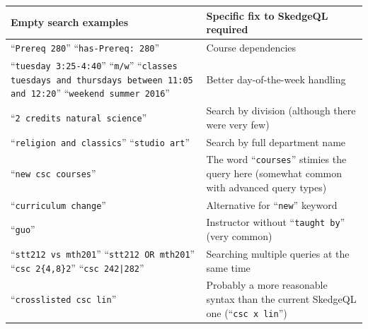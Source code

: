 \singlespacing
{\renewcommand{\arraystretch}{1.75}
\begin{center}
\begin{table}[H]
\vspace{5pt}
  \begin{tabular}{ p{6cm} p{7.5cm} }

    {\large Empty search examples}
    & {\large Specific fix to SkedgeQL required} \\

    \hline
  \hline

    ``{\tt Prereq 280}'' \newline ``{\tt has-Prereq: 280}''
    & Course dependencies \\ \hline

    ``{\tt tuesday 3:25-4:40}'' \newline ``{\tt m/w}'' \newline ``{\tt classes tuesdays and thursdays between 11:05 and 12:20}'' \newline ``{\tt weekend summer 2016}''
    & \parbox[c]{\hsize}{Better day-of-the-week handling} \\ \hline

    ``{\tt 2 credits natural science}'' 
    & Search by division (although there were very few) \\ \hline

    ``{\tt religion and classics}'' \newline ``{\tt studio art}'' 
    & Search by full department name \\ \hline

    ``{\tt new csc courses}'' 
    & The word ``{\tt courses}'' stimies the query here (somewhat common with advanced query types) \\ \hline

    ``{\tt curriculum change}'' 
    & Alternative for ``{\tt new}'' keyword \\ \hline

    ``{\tt guo}'' 
    & Instructor without ``{\tt taught by}'' (very common) \\ \hline

    ``{\tt stt212 vs mth201}'' \newline ``{\tt stt212 OR mth201}'' \newline ``{\tt csc 2\{4,8\}2}'' \newline ``{\tt csc 242|282}''
    & Searching multiple queries at the same time \\ \hline

    ``{\tt crosslisted csc lin}'' 
    & Probably a more reasonable syntax than the current SkedgeQL one (``{\tt csc x lin}'') \\ \hline


\end{tabular}
\end{table}
\end{center}}
